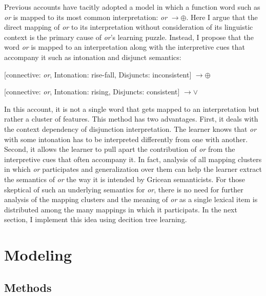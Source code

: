 \documentclass[oneside]{report}
\theoremstyle{definition}
\theoremstyle{definition}
\theoremstyle{definition}
\theoremstyle{remark}
\begin{document}
Previous accounts have tacitly adopted a model in which a function word
such as \emph{or} is mapped to its most common interpretation: \emph{or}
\(\rightarrow \oplus\). Here I argue that the direct mapping of
\emph{or} to its interpretation without consideration of its linguistic
context is the primary cause of \emph{or}'s learning puzzle. Instead, I
propose that the word \emph{or} is mapped to an interpretation along
with the interpretive cues that accompany it such as intonation and
disjunct semantics:

{[}connective: \emph{or}, Intonation: rise-fall, Disjuncts:
inconsistent{]} \(\rightarrow \oplus\)

{[}connective: \emph{or}, Intonation: rising, Disjuncts: consistent{]}
\(\rightarrow \lor\)

In this account, it is not a single word that gets mapped to an
interpretation but rather a cluster of features. This method has two
advantages. First, it deals with the context dependency of disjunction
interpretation. The learner knows that \emph{or} with some intonation
has to be interpreted differently from one with another. Second, it
allows the learner to pull apart the contribution of \emph{or} from the
interpretive cues that often accompany it. In fact, analysis of all
mapping clusters in which \emph{or} participates and generalization over
them can help the learner extract the semantics of \emph{or} the way it
is intended by Gricean semanticists. For those skeptical of such an
underlying semantics for \emph{or}, there is no need for further
analysis of the mapping clusters and the meaning of \emph{or} as a
single lexical item is distributed among the many mappings in which it
participats. In the next section, I implement this idea using decition
tree learning.

\section{Modeling}\label{modeling}

\subsection{Methods}\label{methods-4}
\end{document}
